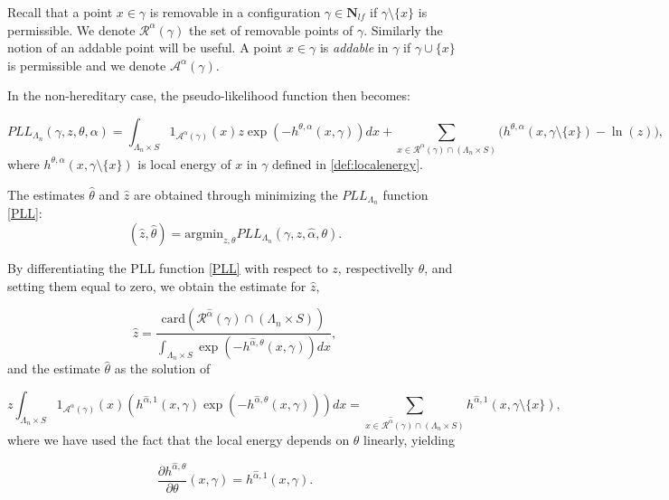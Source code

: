 Recall that a point $x\in\gamma$ is removable in a configuration $\gamma\in\mathbf N_{lf}$ if $\gamma\setminus\{x\}$ is permissible. We denote $\mathcal R^\alpha(\gamma)$ the set of removable points of $\gamma$. Similarly the notion of an addable point will be useful. A point $x\in\gamma$ is \textit{addable} in $\gamma$ if $\gamma \cup \{x\}$ is permissible and we denote $\mathcal A^\alpha(\gamma)$.

In the non-hereditary case, the pseudo-likelihood function then becomes:

\begin{equation}\label{PLL}
	PLL_{\Lambda_n}(\gamma,z,\theta, \alpha) = \int_{\Lambda_n\times S} 1_{\mathcal A^\alpha(\gamma)}(x) z \exp (-h^{\theta,\alpha}(x,\gamma)) dx + \sum_{x\in\mathcal R^\alpha(\gamma)\cap (\Lambda_n\times S)} \big(h^{\theta,\alpha}(x,\gamma\setminus\{x\}) - \ln(z)\big),
\end{equation}
where $h^{\theta,\alpha}(x, \gamma \setminus \{x\})$ is local energy of $x$ in $\gamma$ defined in \ref{def:localenergy}. 

The estimates $\hat\theta$ and $\hat z$ are obtained through minimizing the $PLL_{\Lambda_n}$ function \ref{PLL}:
$$(\hat z, \hat\theta) = \text{argmin}_{z,\theta} PLL_{\Lambda_n} (\gamma, z, \hat\alpha,\theta).$$

By  differentiating the PLL function \ref{PLL} with respect to $z$, respectivelly $\theta$, and setting them equal to zero, we obtain the estimate for $\hat z$,

\begin{equation}\label{z_hat}
	\hat z = \frac{\mbox{card}(\mathcal R^{\hat\alpha}(\gamma)\cap (\Lambda_n\times S))}{\int_{\Lambda_n\times S} \exp{\left( -h^{\hat\alpha,\theta}(x,\gamma)\right)} dx},
\end{equation}
and the estimate $\hat\theta$ as the solution of

\begin{equation}\label{theta_hat} 
	z \int_{\Lambda_n\times S} 1_{\mathcal A^\alpha(\gamma)}(x) (h^{\hat\alpha,1}(x,\gamma)\exp{\left(-h^{\hat\alpha,\theta}(x,\gamma)\right)}) dx = \sum_{x \in \mathcal R^{\hat\alpha}(\gamma)\cap (\Lambda_n\times S)} h^{\hat\alpha,1}(x,\gamma\setminus\{x\}),
\end{equation}
where we have used the fact that the local energy depends on $\theta$ linearly, yielding

$$\frac{\partial h^{\hat\alpha,\theta}}{\partial \theta} (x,\gamma) = h^{\hat\alpha,1}(x,\gamma).$$

